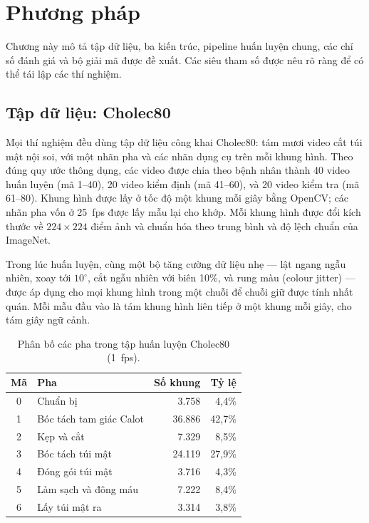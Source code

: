 \chapter{Phương pháp}

Chương này mô tả tập dữ liệu, ba kiến trúc, pipeline huấn luyện chung, các chỉ số đánh giá và bộ giải mã được đề xuất. Các siêu tham số được nêu rõ ràng để có thể tái lập các thí nghiệm.

\section{Tập dữ liệu: Cholec80}

Mọi thí nghiệm đều dùng tập dữ liệu công khai Cholec80: tám mươi video cắt túi mật nội soi, với một nhãn pha và các nhãn dụng cụ trên mỗi khung hình. Theo đúng quy ước thông dụng, các video được chia theo bệnh nhân thành 40 video huấn luyện (mã 1--40), 20 video kiểm định (mã 41--60), và 20 video kiểm tra (mã 61--80). Khung hình được lấy ở tốc độ một khung mỗi giây bằng OpenCV; các nhãn pha vốn ở 25~fps được lấy mẫu lại cho khớp. Mỗi khung hình được đổi kích thước về $224 \times 224$ điểm ảnh và chuẩn hóa theo trung bình và độ lệch chuẩn của ImageNet.

Trong lúc huấn luyện, cùng một bộ tăng cường dữ liệu nhẹ --- lật ngang ngẫu nhiên, xoay tới $10^\circ$, cắt ngẫu nhiên với biên 10\%, và rung màu (colour jitter) --- được áp dụng cho mọi khung hình trong một chuỗi để chuỗi giữ được tính nhất quán. Mỗi mẫu đầu vào là tám khung hình liên tiếp ở một khung mỗi giây, cho tám giây ngữ cảnh.

\begin{table}[H]
\centering
\caption{Phân bố các pha trong tập huấn luyện Cholec80 (1~fps).}
\label{tab:phase_distribution}
\begin{tabular}{clrr}
\toprule
\textbf{Mã} & \textbf{Pha} & \textbf{Số khung} & \textbf{Tỷ lệ} \\
\midrule
0 & Chuẩn bị                   & 3.758  & 4,4\% \\
1 & Bóc tách tam giác Calot    & 36.886 & 42,7\% \\
2 & Kẹp và cắt                 & 7.329  & 8,5\% \\
3 & Bóc tách túi mật           & 24.119 & 27,9\% \\
4 & Đóng gói túi mật           & 3.716  & 4,3\% \\
5 & Làm sạch và đông máu       & 7.222  & 8,4\% \\
6 & Lấy túi mật ra             & 3.314  & 3,8\% \\
\bottomrule
\end{tabular}
\end{table}

